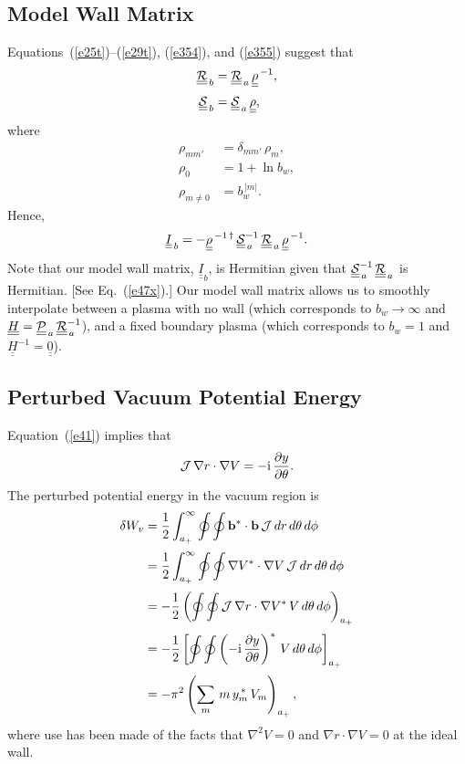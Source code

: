 \documentclass[12pt,prb,aps,notitlepage]{revtex4-1}
\begin{document}
\subsection{Model Wall Matrix}
 Equations~(\ref{e25t})--(\ref{e29t}), (\ref{e354}), and (\ref{e355}) suggest that
 \begin{align}
 \underline{\underline{{\cal R}}}_{\,b}& = \underline{\underline{{\cal R}}}_{\,a} \,\underline{\underline{\rho}}^{\,-1},\\[0.5ex]
 \underline{\underline{{\cal S}}}_{\,b} &= \underline{\underline{{\cal S}}}_{\,a} \,\underline{\underline{\rho}},
 \end{align}
 where
 \begin{align}
 \rho_{mm'} &= \delta_{mm'}\,\rho_m,\\[0.5ex]
 \rho_0 &= 1+\ln b_w,\\[0.5ex]
 \rho_{m\neq 0} &= b_w^{\,|m|}.
 \end{align}
 Hence,
 \begin{equation}
 \underline{\underline{I}}_{\,b}= - \underline{\underline{\rho}}^{\,-1\,\dag}\,\underline{\underline{\cal S}}_{\,a}^{-1}\,\underline{\underline{\cal R}}_{\,a}\,\underline{\underline{\rho}}^{\,-1}.
 \end{equation}
 Note that our model wall matrix, $\underline{\underline{I}}_b$, is Hermitian given that $\underline{\underline{\cal S}}_{\,a}^{-1}\,\underline{\underline{\cal R}}_{\,a}$
 is Hermitian. [See Eq.~(\ref{e47x}).] Our model wall matrix allows us to smoothly interpolate between a plasma with no wall
 (which corresponds to $b_w\rightarrow\infty$ and $\underline{\underline{H}}= \underline{\underline{\cal P}}_{\,a}\,\underline{\underline{\cal R}}_{\,a}^{-1}$), 
 and a fixed boundary plasma (which corresponds to $b_w=1$ and $\underline{\underline{H}}^{-1}= \underline{\underline{0}}$). 
 
\subsection{Perturbed Vacuum Potential Energy}
Equation~(\ref{e41}) implies that 
\begin{equation}
{\cal J} \,\nabla r\cdot\nabla V = - {\rm i}\,\frac{\partial y}{\partial \theta}.
\end{equation}
The perturbed potential energy in the vacuum region is
\begin{align}
\delta W_v &= \frac{1}{2}\int_{a_+}^\infty \oint\oint {\bf b}^\ast\cdot{\bf b}\,{\cal J}\,dr\,d\theta\,d\phi\nonumber\\[0.5ex]
&=\frac{1}{2}\int_{a_+}^\infty \oint\oint \nabla V^\ast\cdot\nabla V\,{\cal J}\,dr\,d\theta\,d\phi\nonumber\\[0.5ex]
&= -\frac{1}{2}\left(\oint\oint {\cal J}\,\nabla r\cdot\nabla V^\ast\,V\,d\theta\,d\phi\right)_{a_+}\nonumber\\[0.5ex]
&=-\frac{1}{2}\left[\oint\oint \left(-{\rm i}\,\frac{\partial y}{\partial \theta}\right)^\ast\,V\,d\theta\,d\phi\right]_{a_+}\nonumber\\[0.5ex]
&= - \pi^2\left(\sum_m\,m\,y_m^{\,\ast}\,V_m\right)_{a_+},\label{vac}
\end{align}
where use has been made of the facts that $\nabla^2 V =0$ and $\nabla r\cdot \nabla V=0$ at the ideal wall. 
\end{document}
